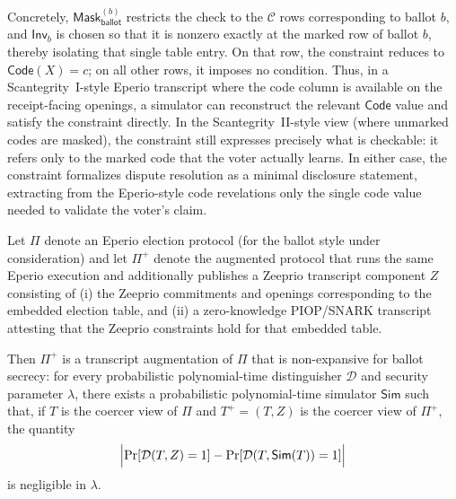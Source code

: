 Concretely, $\mathsf{Mask}^{(b)}_{\mathsf{ballot}}$ restricts the check to the $\mathcal{C}$ rows corresponding to ballot
$b$, and $\mathsf{Inv}_b$ is chosen so that it is nonzero exactly at the marked row of ballot $b$, thereby isolating that
single table entry. On that row, the constraint reduces to $\mathsf{Code}(X)=c$; on all other rows, it imposes no
condition. Thus, in a Scantegrity~I-style Eperio transcript where the code column is available on the receipt-facing
openings, a simulator can reconstruct the relevant $\mathsf{Code}$ value and satisfy the constraint directly. In the
Scantegrity~II-style view (where unmarked codes are masked), the constraint still expresses precisely what is checkable:
it refers only to the marked code that the voter actually learns. In either case, the constraint formalizes dispute
resolution as a minimal disclosure statement, extracting from the Eperio-style code revelations only the single code value
needed to validate the voter’s claim.

\begin{theorem}
Let $\Pi$ denote an Eperio election protocol (for the ballot style under consideration) and let $\Pi^{+}$ denote the
augmented protocol that runs the same Eperio execution and additionally publishes a Zeeprio transcript component $Z$
consisting of (i) the Zeeprio commitments and openings corresponding to the embedded election table, and (ii) a
zero-knowledge PIOP/SNARK transcript attesting that the Zeeprio constraints hold for that embedded table.

Then $\Pi^{+}$ is a transcript augmentation of $\Pi$ that is non-expansive for ballot secrecy: for every probabilistic
polynomial-time distinguisher $\mathcal{D}$ and security parameter $\lambda$, there exists a probabilistic
polynomial-time simulator $\mathsf{Sim}$ such that, if $T$ is the coercer view of $\Pi$ and $T^{+}=(T,Z)$ is the coercer
view of $\Pi^{+}$, the quantity
\[
\Bigl|\Pr[\mathcal{D}(T,Z)=1] - \Pr[\mathcal{D}(T,\mathsf{Sim}(T))=1]\Bigr|
\]
is negligible in $\lambda$.
\end{theorem}


